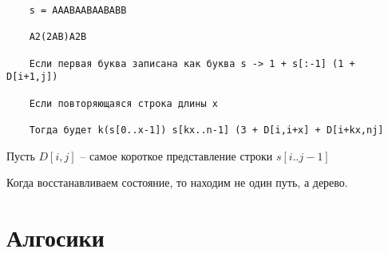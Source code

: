 \documentclass{book}
\theoremstyle{definition}
\begin{document}
\begin{verbatim}
    s = AAABAABAABABB

    A2(2AB)A2B

    Если первая буква записана как буква s -> 1 + s[:-1] (1 + D[i+1,j])

    Если повторяющаяся строка длины x

    Тогда будет k(s[0..x-1]) s[kx..n-1] (3 + D[i,i+x] + D[i+kx,nj]
\end{verbatim}

Пусть $D[i,j]$ -- самое короткое представление строки  $s[i..j-1]$

Когда восстанавливаем состояние, то находим не один путь, а дерево.
\section{Алгосики}
\end{document}
